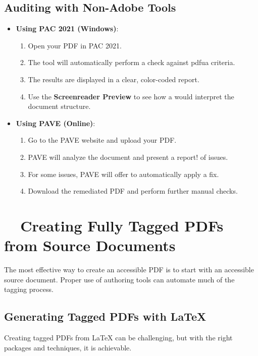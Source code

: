 \subsection{Auditing with Non-Adobe Tools}
\label{subsec:auditing-non-adobe}
\begin{itemize}
	\item \textbf{Using PAC 2021 (Windows)}:
	      \begin{enumerate}
		      \item Open your PDF in PAC 2021.
		      \item The tool will automatically perform a check against \gls{pdfua} criteria.
		      \item The results are displayed in a clear, color-coded report.
		      \item Use the \textbf{Screenreader Preview} to see how a  would interpret the document structure.
	      \end{enumerate}
	\item \textbf{Using PAVE (Online)}:
	      \begin{enumerate}
		      \item Go to the PAVE website and upload your PDF.
		      \item PAVE will analyze the document and present a report! of issues.
		      \item For some issues, PAVE will offer to automatically apply a fix.
		      \item Download the remediated PDF and perform further manual checks.
	      \end{enumerate}
\end{itemize}

\section{~~Creating Fully Tagged PDFs from Source Documents}
\label{sec:creating-tagged-pdfs}
The most effective way to create an accessible PDF is to start with an accessible source document. Proper use of authoring tools can automate much of the tagging process.

\subsection{Generating Tagged PDFs with LaTeX}
\label{subsec:tagged-pdfs-latex}
Creating tagged PDFs from LaTeX can be challenging, but with the right packages and techniques, it is achievable.

